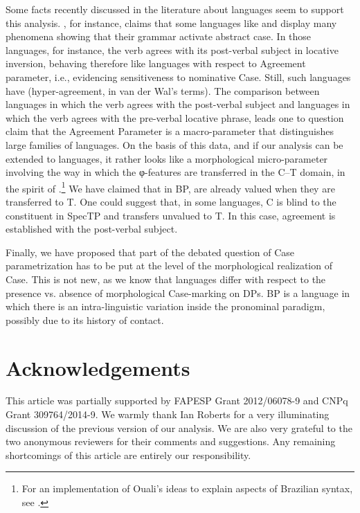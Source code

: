 \documentclass[output=paper]{langsci/langscibook}
\begin{document}
Some facts recently discussed in the literature about  languages seem to
support this analysis. , for instance, claims that
some  languages like  and  display many
phenomena showing that their grammar activate abstract case. In those
languages, for instance, the verb agrees with its post-verbal subject in
locative inversion, behaving therefore like  languages with
respect to  Agreement parameter, i.e., evidencing
sensitiveness to nominative Case. Still, such languages have 
(hyper-agreement, in van der Wal’s terms).  The comparison between 
languages in which the verb agrees with the post-verbal subject and 
languages in which the verb agrees with the pre-verbal locative phrase, leads
one to question  claim that the Agreement Parameter is a
macro-parameter that distinguishes large families of languages. On the basis of
this data, and if our analysis can be extended to  languages, it rather
looks like a morphological micro-parameter involving the way in which the
φ-features are transferred in the C--T domain, in the spirit of
\citet{Ouali2008}.\footnote{For an implementation of Ouali’s ideas to explain
aspects of Brazilian syntax, see \citet{Toniette2013}.} We have claimed that in
BP,  are already valued when they are transferred to T.  One could
suggest that, in some languages, C is blind to the constituent in SpecTP and
transfers unvalued  to T. In this case, agreement is established with
the post-verbal subject.

Finally, we have proposed that part of the debated question of Case
parametrization has to be put at the level of the morphological realization of
Case. This is not new, as we know that languages differ with respect to the
presence vs. absence of morphological Case-marking on DPs.  BP is a language in
which there is an intra-linguistic variation inside the pronominal paradigm,
possibly due to its history of contact.

\printchapterglossary{}

\section*{Acknowledgements}

This article was partially supported by FAPESP Grant 2012/06078-9 and CNPq
Grant 309764/2014-9. We warmly thank Ian Roberts for a very illuminating
discussion of the previous version of our analysis. We are also very grateful
to the two anonymous reviewers for their comments and suggestions. Any
remaining shortcomings of this article are entirely our responsibility.

{\sloppy
\printbibliography[heading=subbibliography,notkeyword=this]
}
\end{document}
